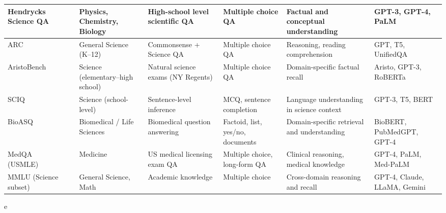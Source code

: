 \begin{table*}[!ht]
{\begin{tabular}{|p{}p{}|p{}|p{}|p{}|p{}|p{}|}
\hline
Hendrycks Science QA &~\cite{hendrycks2021measuring} & Physics, Chemistry, Biology & High-school level scientific QA & Multiple choice QA & Factual and conceptual understanding & GPT-3, GPT-4, PaLM \\
\hline
ARC &~\cite{clark2018arc} & General Science (K–12) & Commonsense + Science QA & Multiple choice QA & Reasoning, reading comprehension & GPT, T5, UnifiedQA \\
\hline
AristoBench &~\cite{clark2016combining} & Science (elementary–high school) & Natural science exams (NY Regents) & Multiple choice QA & Domain-specific factual recall & Aristo, GPT-3, RoBERTa \\
\hline
SCIQ &~\cite{welbl2017crowdsourcing} & Science (school-level) & Sentence-level inference & MCQ, sentence completion & Language understanding in science context & GPT-3, T5, BERT \\
\hline
BioASQ &~\cite{krithara2023bioasq} & Biomedical / Life Sciences & Biomedical question answering & Factoid, list, yes/no, documents & Domain-specific retrieval and understanding & BioBERT, PubMedGPT, GPT-4 \\
\hline
MedQA (USMLE) &~\cite{jin2021disease} & Medicine & US medical licensing exam QA & Multiple choice, long-form QA & Clinical reasoning, medical knowledge & GPT-4, PaLM, Med-PaLM \\
\hline
MMLU (Science subset) &~\cite{hendrycks2021measuring} & General Science, Math & Academic knowledge & Multiple choice & Cross-domain reasoning and recall & GPT-4, Claude, LLaMA, Gemini \\
\hline
\end{tabular}%
e}
\end{table*}



\begin{comment}
scimlbench
please add others
Geoffrey pointed many out but i did not have time to write them down

adaptive scale of benchmarks
    x single server
    y single gpu
    run on multiple x and y

impact of network
impact of multiuser

This is translated with Claude via AI from the image:

Screenshot 20250520 at 8.35.23 PM.png
given can you convert the table to a latex table

I'd be happy to convert this table to LaTeX format. Here's the complete LaTeX code for the table:

\end{comment}

